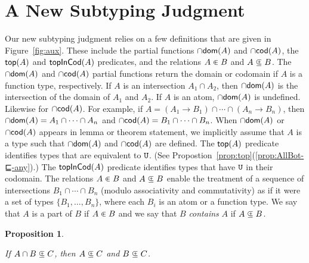 \documentclass{article}
\newtheorem{proposition}[theorem]{Proposition}
\begin{document}
    

\section{A New Subtyping Judgment}
\label{sec:new-subtyping}

Our new subtyping judgment relies on a few definitions that are given
in Figure~\ref{fig:aux}. These include the partial functions $\cap\mathsf{dom}(A)$
and $\cap\mathsf{cod}(A)$, the $\mathsf{top}(A)$ and $\mathsf{topInCod}(A)$ predicates, and the
relations $A \inplus B$ and $A \subsetpluseq B$.
%
The $\cap\mathsf{dom}(A)$ and $\cap\mathsf{cod}(A)$ partial functions return the domain or
codomain if $A$ is a function type, respectively. If $A$ is an
intersection $A_1 \cap A_2$, then $\cap\mathsf{dom}(A)$ is the intersection of the
domain of $A_1$ and $A_2$.  If $A$ is an atom, $\cap\mathsf{dom}(A)$ is
undefined. Likewise for $\cap\mathsf{cod}(A)$. For example, if $A = (A_1 \to B_1)
\cap \cdots \cap (A_n \to B_n)$, then $\cap\mathsf{dom}(A) = A_1 \cap \cdots \cap
A_n$ and $\cap\mathsf{cod}(A) = B_1 \cap \cdots \cap B_n$.  When $\cap\mathsf{dom}(A)$ or
$\cap\mathsf{cod}(A)$ appears in lemma or theorem statement, we implicitly assume
that $A$ is a type such that $\cap\mathsf{dom}(A)$ and $\cap\mathsf{cod}(A)$ are defined.
%
The $\mathsf{top}(A)$ predicate identifies types that are equivalent to
$\mathtt{U}$. (See Propostion~\ref{prop:top}(\ref{prop:AllBot-⊑-any}).) The
$\mathsf{topInCod}(A)$ predicate identifies types that have $\mathtt{U}$ in their
codomain.
%
The relations $A \inplus B$ and $A \subsetpluseq B$ enable the
treatment of a sequence of intersections $B_1 \cap \cdots \cap B_n$
(modulo associativity and commutativity) as if it were a set of types
$\{ B_1, \ldots, B_n \}$, where each $B_i$ is an atom or a function
type.  We say that $A$ is a part of $B$ if $A \inplus B$ and we say
that $B$ \emph{contains} $A$ if $A \subsetpluseq B$.

\begin{proposition}\label{prop:union-subset-inv}
 \item If $A \cap B \subsetpluseq C$, then $A \subsetpluseq C$ and $B \subsetpluseq C$. 
\end{proposition}
\end{document}
